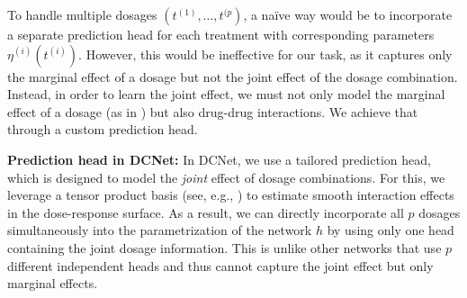\documentclass{article}
\theoremstyle{definition}
\theoremstyle{plain}
\begin{document}
To handle multiple dosages $(t^{(1)}, \dots, t^{(p})$, a na{\"i}ve way \cite{Bellot.2022} would be to incorporate a separate prediction head for each treatment with corresponding parameters $\eta^{(i)}(t^{(i)})$. However, this would be ineffective for our task, as it captures only the marginal effect of a dosage but not the joint effect of the dosage combination. Instead, in order to learn the joint effect, we must not only model the marginal effect of a dosage (as in \cite{Bellot.2022}) but also drug-drug interactions. We achieve that through a custom prediction head.
 

\textbf{Prediction head in DCNet:} In DCNet, we use a tailored prediction head, which is designed to model the \emph{joint} effect of dosage combinations. For this, we leverage a tensor product basis (see, e.g., \cite{Lin.1999, Wood.2006}) to estimate smooth interaction effects in the dose-response surface. As a result, we can directly incorporate all $p$ dosages simultaneously into the parametrization of the network $h$ by using only one head containing the joint dosage information. This is unlike other networks that use $p$ different independent heads \cite{Bellot.2022} and thus cannot capture the joint effect but only marginal effects.
\end{document}
